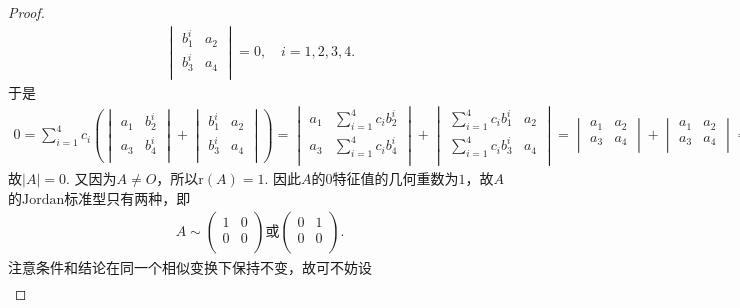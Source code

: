\documentclass[../../main.tex]{subfiles}
\begin{document}
\begin{proof}
\begin{align*}
\begin{vmatrix}
b_{1}^{i}&		a_2\\
b_{3}^{i}&		a_4\\
\end{vmatrix}=0,\quad i=1,2,3,4.
\end{align*}
于是
\begin{align*}
0=\sum_{i=1}^4{c_i\left( \begin{vmatrix}
a_1&		b_{2}^{i}\\
a_3&		b_{4}^{i}\\
\end{vmatrix}+\begin{vmatrix}
b_{1}^{i}&		a_2\\
b_{3}^{i}&		a_4\\
\end{vmatrix} \right)}=\begin{vmatrix}
a_1&		\sum_{i=1}^4{c_ib_{2}^{i}}\\
a_3&		\sum_{i=1}^4{c_ib_{4}^{i}}\\
\end{vmatrix}+\begin{vmatrix}
\sum_{i=1}^4{c_ib_{1}^{i}}&		a_2\\
\sum_{i=1}^4{c_ib_{3}^{i}}&		a_4\\
\end{vmatrix}
=\begin{vmatrix}
a_1&		a_2\\
a_3&		a_4\\
\end{vmatrix}+\begin{vmatrix}
a_1&		a_2\\
a_3&		a_4\\
\end{vmatrix}=2\left| A \right|.
\end{align*}
故$\left| A \right|=0$. 又因为$A\ne O$，所以$\text{r}\left( A \right) =1$. 因此$A$的$0$特征值的几何重数为$1$，故$A$的$\text{Jordan}$标准型只有两种，即
\begin{align*}
A\sim \begin{pmatrix}
1&		0\\
0&		0\\
\end{pmatrix}\text{或}\begin{pmatrix}
0&		1\\
0&		0\\
\end{pmatrix}.
\end{align*}
注意条件和结论在同一个相似变换下保持不变，故可不妨设
\begin{align*}

\end{align*}
\end{proof}
\end{document}
